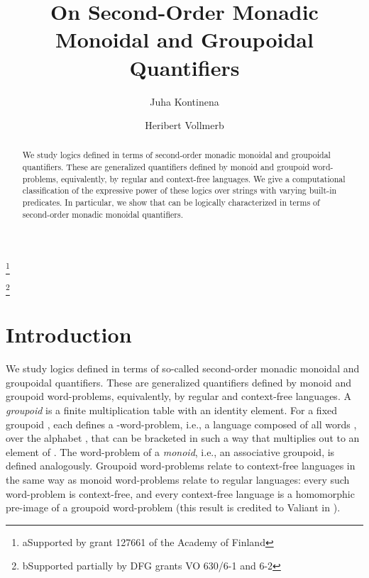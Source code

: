 \documentclass{LMCS}
\begin{document}
\title[On Second-Order Monadic Monoidal and Groupoidal Quantifiers]{On Second-Order Monadic Monoidal and Groupoidal Quantifiers\rsuper*}


\author[J.~Kontinen]{Juha Kontinen\rsuper a}
\address{{\lsuper a}Department of Mathematics and Statistics, University of Helsinki, P.O. Box 68, FI-00014 University of Helsinki, Finland}
\thanks{{\lsuper a}Supported by grant 127661 of the Academy of Finland}

\author[H.~Vollmer]{Heribert Vollmer\rsuper b}
\address{{\lsuper b}Institut f\"ur Theoretische Informatik, Universit\"at
Hannover, Appelstra\ss e 4, 30167 Hannover, Germany}
\thanks{{\lsuper b}Supported partially by DFG grants VO 630/6-1 and 6-2}


\begin{abstract}
We study logics defined in terms of second-order monadic monoidal and groupoidal quantifiers.
These are generalized quantifiers defined by monoid and groupoid
word-problems, equivalently, by regular and context-free languages. We give a computational classification 
of the expressive power of these logics over strings with varying built-in predicates. In particular, we show that  
 can be logically characterized in terms of  second-order monadic monoidal quantifiers. 
\end{abstract}
 

\maketitle

\section{Introduction}


\noindent We study logics defined in terms of so-called second-order
monadic monoidal and groupoidal quantifiers.  These are generalized
quantifiers defined by monoid and groupoid word-problems,
equivalently, by regular and context-free languages.  A
\emph{groupoid} is a finite multiplication table with an identity
element.  For a fixed groupoid , each  defines a
-word-problem, i.e., a language  composed of all
words , over the alphabet , that can be bracketed in such a way
that  multiplies out to an element of . The word-problem of a
\emph{monoid}, i.e., an associative groupoid, is defined analogously.
Groupoid word-problems relate to context-free languages in the same
way as monoid word-problems relate to regular languages: every such
word-problem is context-free, and every context-free language is a
homomorphic pre-image of a groupoid word-problem (this result is
credited to Valiant in \cite{belemc93}).
\end{document}
